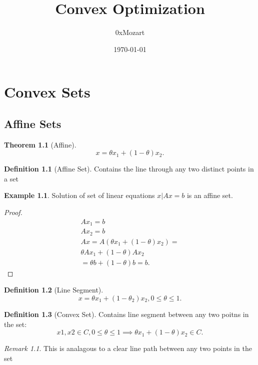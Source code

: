 \documentclass{report}
\title{\Huge{Convex Optimization}}
\author{\huge{0xMozart}}
\date{\today}
\newtheorem{theorem}{Theorem}[section]
\theoremstyle{remark} \newtheorem{remark}{Remark}[section]
\theoremstyle{definition}
\newtheorem{definition}{Definition}[section]
\theoremstyle{definition}
\newtheorem{example}{Example}[section]
\theoremstyle{definition}
\theoremstyle{remark}
\begin{document}
\maketitle
\newpage
\tableofcontents

\chapter{Convex Sets}

\section{Affine Sets}

\begin{theorem}[Affine]
    \[
    x = \theta x_1 + (1 - \theta)x_2
    .\] 
\end{theorem}

\begin{definition}[Affine Set]
    Contains the line through any two distinct points in a set
       
\end{definition}


\begin{example}
    Solution of set of linear equations ${x | Ax = b}$ is an affine set. 
\end{example}

\begin{proof}
    \begin{align*}
        Ax_1 = b \\
        Ax_2 = b \\
        Ax = A(\theta x_1 + (1-\theta)x_2) = \\
        \theta Ax_1 + (1-\theta)Ax_2 \\
        = \theta b + (1-\theta)b = b
    .\end{align*}
\end{proof}

\begin{definition}[Line Segment]
    \[
    x = \theta x_1 + (1-\theta_2)x_2, 0 \le \theta \le 1
    .\] 
\end{definition}

\begin{definition}[Convex Set]
      Contains line segment between any two poitns in the set:
      \[
          x1,x2 \in C, 0 \le \theta \le 1 \implies \theta x_1 + (1-\theta)x_2 \in C
      .\] 
\end{definition}


\begin{remark}
    This is analagous to a clear line path between any two points in the set   
\end{remark}
\end{document}

